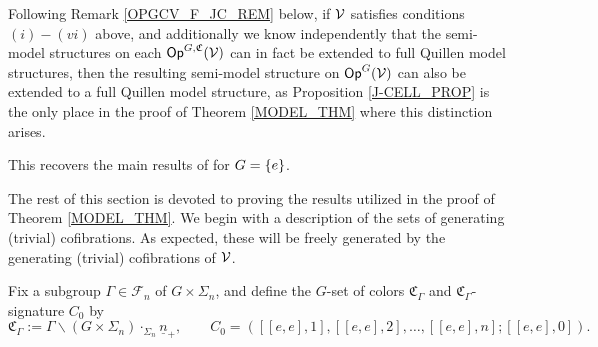 \documentclass[a4paper,10pt
,draft
]{article}%
\renewcommand{\F}{\mathcal F}
\renewcommand{\1}{\eta}%
\begin{document}

\begin{remark}
      \label{OPGCV_FULL_REM}
      Following Remark \ref{OPGCV_F_JC_REM} below, if $\mathcal V$ satisfies conditions $(i) - (vi)$ above,
      and additionally we know independently that
      the semi-model structures on each $\mathsf{Op}^{G, \mathfrak C}(\mathcal V)$ can in fact be extended to full Quillen model structures,
      then the resulting semi-model structure on $\mathsf{Op}^G(\mathcal V)$ can also be extended to a full Quillen model structure,
      as Proposition \ref{J-CELL_PROP} is the only place in the proof of Theorem \ref{MODEL_THM} where this distinction arises.
\end{remark}

\begin{remark}
      This recovers the main results of \cite{BM13, Cav} for $G = \left\{e\right\}$. 
\end{remark}



The rest of this section is devoted to proving the results utilized in the proof of Theorem \ref{MODEL_THM}.
We begin with a description of the sets of generating (trivial) cofibrations.
As expected, these will be freely generated by the generating (trivial) cofibrations of $\mathcal V$.

Fix a subgroup $\Gamma \in \F_n$ of $G \times \Sigma_n$,
and define the $G$-set of colors $\mathfrak C_\Gamma$ and $\mathfrak C_\Gamma$-signature $C_0$ by
\[
      \mathfrak C_\Gamma := \Gamma \backslash (G \times \Sigma_n) \cdot_{\Sigma_n} \underline{n}_+,
      \qquad
      C_0 = ([[e,e],1],[[e,e],2],\dots,[[e,e],n];[[e,e],0]).
\]
\end{document}
